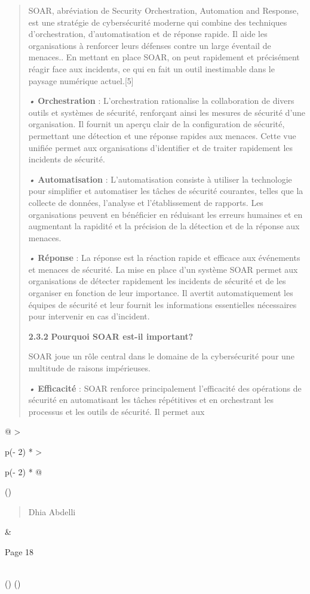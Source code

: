 \documentclass[
]{article}
\begin{document}
\begin{quote}
SOAR, abréviation de Security Orchestration, Automation and Response,
est une stratégie de cybersécurité moderne qui combine des techniques
d'orchestration, d'automatisation et de réponse rapide. Il aide les
organisations à renforcer leurs défenses contre un large éventail de
menaces.. En mettant en place SOAR, on peut rapidement et précisément
réagir face aux incidents, ce qui en fait un outil inestimable dans le
paysage numérique actuel.{[}5{]}

\emph{•} \textbf{Orchestration} : L'orchestration rationalise la
collaboration de divers outils et systèmes de sécurité, renforçant ainsi
les mesures de sécurité d'une organisation. Il fournit un aperçu clair
de la configuration de sécurité, permettant une détection et une réponse
rapides aux menaces. Cette vue unifiée permet aux organisations
d'identifier et de traiter rapidement les incidents de sécurité.

\emph{•} \textbf{Automatisation} : L'automatisation consiste à utiliser
la technologie pour simplifier et automatiser les tâches de sécurité
courantes, telles que la collecte de données, l'analyse et
l'établissement de rapports. Les organisations peuvent en bénéficier en
réduisant les erreurs humaines et en augmentant la rapidité et la
précision de la détection et de la réponse aux menaces.

\emph{•} \textbf{Réponse} : La réponse est la réaction rapide et
efficace aux événements et menaces de sécurité. La mise en place d'un
système SOAR permet aux organisations de détecter rapidement les
incidents de sécurité et de les organiser en fonction de leur
importance. Il avertit automatiquement les équipes de sécurité et leur
fournit les informations essentielles nécessaires pour intervenir en cas
d'incident.

\textbf{2.3.2} \textbf{Pourquoi SOAR est-il important?}

SOAR joue un rôle central dans le domaine de la cybersécurité pour une
multitude de raisons impérieuses.

\emph{•} \textbf{Efficacité} : SOAR renforce principalement l'efficacité
des opérations de sécurité en automatisant les tâches répétitives et en
orchestrant les processus et les outils de sécurité. Il permet aux
\end{quote}

\begin{longtable}[]{@{}
  >{\raggedright\arraybackslash}p{(\columnwidth - 2\tabcolsep) * }
  >{\raggedright\arraybackslash}p{(\columnwidth - 2\tabcolsep) * }@{}}
\toprule()
\begin{minipage}[b]{\linewidth}\raggedright
\begin{quote}
Dhia Abdelli
\end{quote}
\end{minipage} & \begin{minipage}[b]{\linewidth}\raggedright
Page 18
\end{minipage} \\
\midrule()
\endhead
\bottomrule()
\end{longtable}
\end{document}

